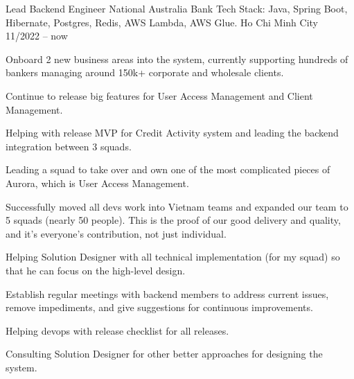 

\begin{cventries}

   

    
    \cventry
    {Lead Backend Engineer} %
    {National Australia Bank
        \newline
         \fontsize{9}{18}\selectfont \textnormal {Tech Stack: Java, Spring Boot, Hibernate, Postgres, Redis, AWS Lambda, AWS Glue.}
    } %
    {Ho Chi Minh City} %
    {11/2022 -- now} %
    {
        \begin{cvitems} %
            \item{Onboard 2 new business areas into the system, currently supporting hundreds of bankers managing around 150k+ corporate and wholesale clients.}
            \item{Continue to release big features for User Access Management and Client Management.}
            \item{Helping with release MVP for Credit Activity system and leading the backend integration between 3 squads.}
            \item {Leading a squad to take over and own one of the most complicated pieces of Aurora, which is User Access Management.}
            \item {Successfully moved all devs work into Vietnam teams and expanded our team to 5 squads (nearly 50 people). This is the proof of our good delivery and quality, and it's everyone's contribution, not just individual.}
            \item {Helping Solution Designer with all technical implementation (for my squad) so that he can focus on the high-level design.}
            \item {Establish regular meetings with backend members to address current issues, remove impediments, and give suggestions for continuous improvements.}
            \item {Helping devops with release checklist for all releases.}
            \item {Consulting Solution Designer for other better approaches for designing the system.}

\end{cvitems}}
\end{cventries}
